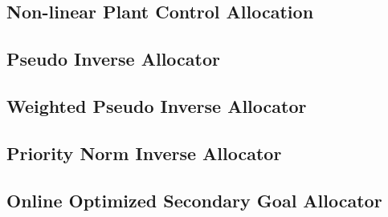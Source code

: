 \subsection{Non-linear Plant Control Allocation}
\label{subsec:control.allocation.allocators}
\subsection{Pseudo Inverse Allocator}
\subsection{Weighted Pseudo Inverse Allocator}
\subsection{Priority Norm Inverse Allocator}
\subsection{Online Optimized Secondary Goal Allocator}
